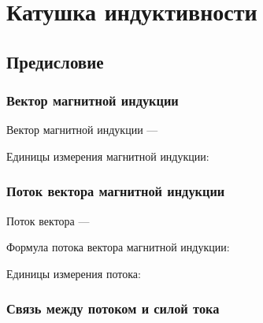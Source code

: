 \section{Катушка индуктивности}

\subsection{Предисловие}

\subsubsection{Вектор магнитной индукции}

Вектор магнитной индукции --- \hrulefill

\hrulefill

\hrulefill

Единицы измерения магнитной индукции:



\subsubsection{Поток вектора магнитной индукции}

Поток вектора --- \hrulefill

\hrulefill

\hrulefill


Формула потока вектора магнитной индукции:


Единицы измерения потока:


\subsubsection{Связь между потоком и силой тока}

